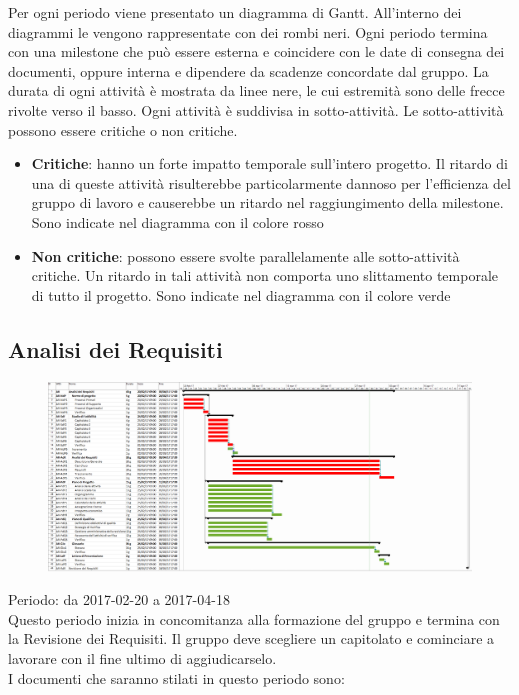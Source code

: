 Per ogni periodo viene presentato un diagramma di Gantt.
All'interno dei diagrammi le  vengono rappresentate con dei rombi neri.
Ogni periodo termina con una milestone che può essere esterna e coincidere con le
date di consegna dei documenti, oppure interna e dipendere da scadenze concordate
dal gruppo.
La durata di ogni attività è mostrata da linee nere, le cui estremità sono
delle frecce rivolte verso il basso. Ogni attività è suddivisa in sotto-attività.
Le sotto-attività possono essere critiche o non critiche.

\begin{itemize}
\item \textbf{Critiche}: hanno un forte impatto temporale sull'intero progetto.
  Il ritardo di una di queste attività risulterebbe particolarmente dannoso per
  l'efficienza del gruppo di lavoro e causerebbe un ritardo nel raggiungimento della
  milestone.
  Sono indicate nel diagramma con il colore rosso
\item \textbf{Non critiche}: possono essere svolte parallelamente alle sotto-attività critiche.
  Un ritardo in tali attività non comporta uno slittamento temporale di tutto il progetto.
  Sono indicate nel diagramma con il colore verde
\end{itemize}

\subsection{Analisi dei Requisiti}

\begin{figure}
  \centering
  \includegraphics[scale=0.28]{img/1-AR.png}
\end{figure}

Periodo: da 2017-02-20 a 2017-04-18 \\
Questo periodo inizia in concomitanza alla formazione del gruppo e termina con la Revisione dei Requisiti. Il gruppo deve scegliere un capitolato e cominciare a lavorare con il fine ultimo di aggiudicarselo.\\
I documenti che saranno stilati in questo periodo sono:


